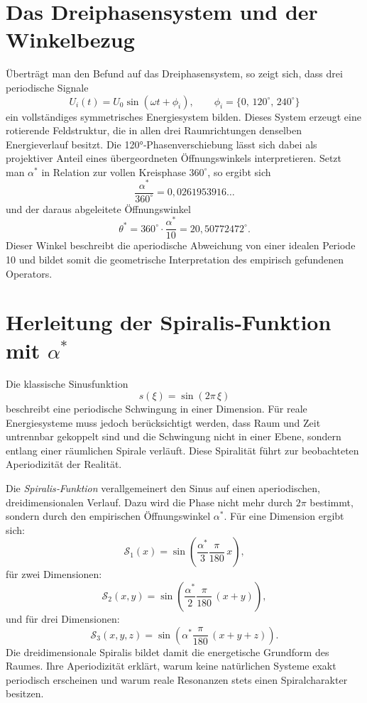 \section{Das Dreiphasensystem und der Winkelbezug}

Überträgt man den Befund auf das Dreiphasensystem,
so zeigt sich, dass drei periodische Signale
\[
U_i(t) = U_0 \sin(\omega t + \phi_i),
\qquad
\phi_i = \{0,\,120^\circ,\,240^\circ\}
\]
ein vollständiges symmetrisches Energiesystem bilden.
Dieses System erzeugt eine rotierende Feldstruktur,
die in allen drei Raumrichtungen denselben Energieverlauf besitzt.
Die 120°‐Phasenverschiebung lässt sich dabei
als projektiver Anteil eines übergeordneten Öffnungswinkels interpretieren.
Setzt man $\alpha^*$ in Relation zur vollen Kreisphase $360^\circ$,
so ergibt sich
\[
\frac{\alpha^*}{360^\circ} = 0{,}0261953916\dots
\]
und der daraus abgeleitete Öffnungswinkel
\[
\theta^* = 360^\circ \cdot \frac{\alpha^*}{10} = 20{,}50772472^\circ.
\]
Dieser Winkel beschreibt die aperiodische Abweichung
von einer idealen Periode 10
und bildet somit die geometrische Interpretation
des empirisch gefundenen Operators.

\section{Herleitung der Spiralis‐Funktion mit $\alpha^*$}

Die klassische Sinusfunktion
\[
s(\xi) = \sin(2\pi\,\xi)
\]
beschreibt eine periodische Schwingung in einer Dimension.
Für reale Energiesysteme muss jedoch berücksichtigt werden,
dass Raum und Zeit untrennbar gekoppelt sind
und die Schwingung nicht in einer Ebene,
sondern entlang einer räumlichen Spirale verläuft.
Diese Spiralität führt zur beobachteten Aperiodizität der Realität.

Die \emph{Spiralis‐Funktion} verallgemeinert den Sinus
auf einen aperiodischen, dreidimensionalen Verlauf.
Dazu wird die Phase nicht mehr durch $2\pi$ bestimmt,
sondern durch den empirischen Öffnungswinkel $\alpha^*$.
Für eine Dimension ergibt sich:
\[
\mathcal{S}_1(x) = \sin\!\left(\frac{\alpha^*}{3}\frac{\pi}{180}\,x\right),
\]
für zwei Dimensionen:
\[
\mathcal{S}_2(x,y) = \sin\!\left(\frac{\alpha^*}{2}\frac{\pi}{180}\,(x+y)\right),
\]
und für drei Dimensionen:
\[
\boxed{
\mathcal{S}_3(x,y,z)
= \sin\!\left(\alpha^*\frac{\pi}{180}\,(x+y+z)\right).
}
\]
Die dreidimensionale Spiralis bildet damit
die energetische Grundform des Raumes.
Ihre Aperiodizität erklärt,
warum keine natürlichen Systeme exakt periodisch erscheinen
und warum reale Resonanzen stets einen Spiralcharakter besitzen.

